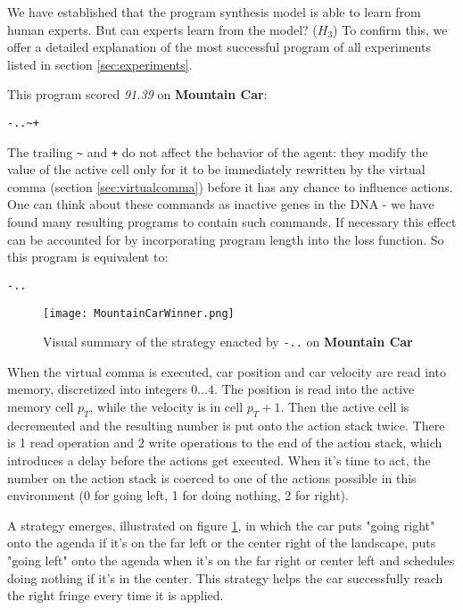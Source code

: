We have established that the program synthesis model is able to learn from human experts.
But can experts learn from the model? ($H_3$) 
To confirm this, we offer a detailed explanation of the most successful program of all experiments listed in section \ref{sec:experiments}.

This program scored \emph{91.39} on \textbf{Mountain Car}:

\begin{center}
\begin{lstlisting}
-..~+
\end{lstlisting}
\end{center}

The trailing \verb|~| and \verb|+| do not affect the behavior of the agent: they modify the value of the active cell only for it to be immediately rewritten by the virtual comma (section \ref{sec:virtualcomma}) before it has any chance to influence actions.
One can think about these commands as inactive genes in the DNA - we have found many resulting programs to contain such commands.
If necessary this effect can be accounted for by incorporating program length into the loss function.
So this program is equivalent to:

\begin{center}
\begin{lstlisting}
-..
\end{lstlisting}
\end{center}

\begin{figure}
    \centering
    \texttt{[image: MountainCarWinner.png]}
    \caption{Visual summary of the strategy enacted by \texttt{-..} on \textbf{Mountain Car}}
    \label{fig:mountaincarwinner}
\end{figure}

When the virtual comma is executed, car position and car velocity are read into memory, discretized into integers $0\dots4$.
The position is read into the active memory cell $p_T$, while the velocity is in cell $p_T+1$.
Then the active cell is decremented and the resulting number is put onto the action stack twice.
There is 1 read operation and 2 write operations to the end of the action stack, which introduces a delay before the actions get executed.
When it's time to act, the number on the action stack is coerced to one of the actions possible in this environment (0 for going left, 1 for doing nothing, 2 for right). 

A strategy emerges, illustrated on figure \ref{fig:mountaincarwinner}, in which the car puts "going right" onto the agenda if it's on the far left or the center right of the landscape, puts "going left" onto the agenda when it's on the far right or center left and schedules doing nothing if it's in the center.
This strategy helps the car successfully reach the right fringe every time it is applied.

